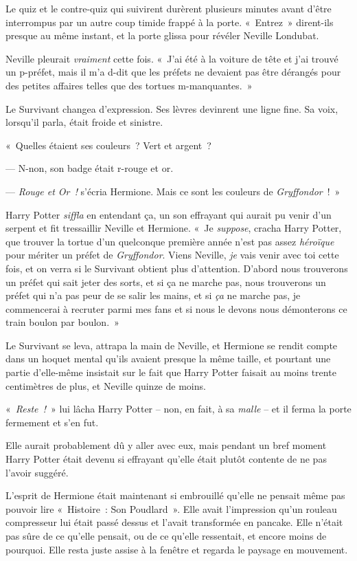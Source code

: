 Le quiz et le contre-quiz qui suivirent durèrent plusieurs minutes avant d'être interrompus par un autre coup timide frappé à la porte. «~Entrez~» dirent-ils presque au même instant, et la porte glissa pour révéler Neville Londubat.

Neville pleurait \emph{vraiment} cette fois. «~J'ai été à la voiture de tête et j'ai trouvé un p-préfet, mais il m'a d-dit que les préfets ne devaient pas être dérangés pour des petites affaires telles que des tortues m-manquantes.~»

Le Survivant changea d'expression. Ses lèvres devinrent une ligne fine. Sa voix, lorsqu'il parla, était froide et sinistre.

«~Quelles étaient ses couleurs~? Vert et argent~?

--- N-non, son badge était r-rouge et or.

--- \emph{Rouge et Or~!} s'écria Hermione. Mais ce sont les couleurs de \emph{Gryffondor}~!~»

Harry Potter \emph{siffla} en entendant ça, un son effrayant qui aurait pu venir d'un serpent et fit tressaillir Neville et Hermione. «~Je \emph{suppose}, cracha Harry Potter, que trouver la tortue d'un quelconque première année n'est pas assez \emph{héroïque} pour mériter un préfet de \emph{Gryffondor}. Viens Neville, \emph{je} vais venir avec toi cette fois, et on verra si le Survivant obtient plus d'attention. D'abord nous trouverons un préfet qui sait jeter des sorts, et si ça ne marche pas, nous trouverons un préfet qui n'a pas peur de se salir les mains, et si \emph{ça} ne marche pas, je commencerai à recruter parmi mes fans et si nous le devons nous démonterons ce train boulon par boulon.~»

Le Survivant se leva, attrapa la main de Neville, et Hermione se rendit compte dans un hoquet mental qu'ils avaient presque la même taille, et pourtant une partie d'elle-même insistait sur le fait que Harry Potter faisait au moins trente centimètres de plus, et Neville quinze de moins.

«~\emph{Reste~!}~» lui lâcha Harry Potter -- non, en fait, à sa \emph{malle} -- et il ferma la porte fermement et s'en fut.

Elle aurait probablement dû y aller avec eux, mais pendant un bref moment Harry Potter était devenu si effrayant qu'elle était plutôt contente de ne pas l'avoir suggéré.

L'esprit de Hermione était maintenant si embrouillé qu'elle ne pensait même pas pouvoir lire «~Histoire~: Son Poudlard~». Elle avait l'impression qu'un rouleau compresseur lui était passé dessus et l'avait transformée en pancake. Elle n'était pas sûre de ce qu'elle pensait, ou de ce qu'elle ressentait, et encore moins de pourquoi. Elle resta juste assise à la fenêtre et regarda le paysage en mouvement.

